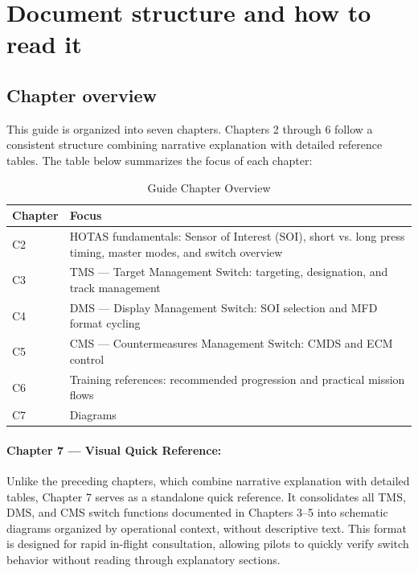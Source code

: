 \documentclass[11pt, a4paper, twoside]{report}
\begin{document}
\section{Document structure and how to read it}
\label{sec:C1-S3}

\subsection{Chapter overview}
\label{sec:C1-S3-S1}

This guide is organized into seven chapters. Chapters 2 through 6 follow a consistent structure combining narrative explanation with detailed reference tables. The table below summarizes the focus of each chapter:

\begin{table}[H]
	\centering
	\caption{Guide Chapter Overview}
	\label{tab:C1-chapter-overview}
	\small
	\renewcommand{\arraystretch}{1.25}
	\begin{tabular}{C{1.5cm} L{12.0cm}}
		\toprule
		\textbf{Chapter} & \textbf{Focus} \\
		\midrule
		C2 & HOTAS fundamentals: Sensor of Interest (SOI), short vs. long press timing, master modes, and switch overview \\
		C3 & TMS --- Target Management Switch: targeting, designation, and track management \\
		C4 & DMS --- Display Management Switch: SOI selection and MFD format cycling \\
		C5 & CMS --- Countermeasures Management Switch: CMDS and ECM control \\
		C6 & Training references: recommended progression and practical mission flows \\
		C7 & Diagrams \\
		\bottomrule
	\end{tabular}
\end{table}

\paragraph{Chapter 7 --- Visual Quick Reference:}
Unlike the preceding chapters, which combine narrative explanation with detailed tables, Chapter 7 serves as a standalone quick reference. It consolidates all TMS, DMS, and CMS switch functions documented in Chapters 3--5 into schematic diagrams organized by operational context, without descriptive text. This format is designed for rapid in-flight consultation, allowing pilots to quickly verify switch behavior without reading through explanatory sections.
\end{document}

